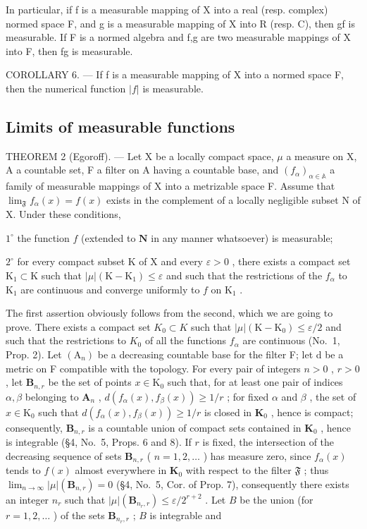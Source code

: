 In particular, if f is a measurable mapping of X into a real (resp. complex) normed space F, and g is a measurable mapping of X into R (resp. C), then gf is measurable. If F is a normed algebra and f,g are two measurable mappings of X into F, then fg is measurable.

COROLLARY 6. --- If f is a measurable mapping of X into a normed space F, then the numerical function \(|f|\) is measurable.

\subsection{Limits of measurable functions}

THEOREM 2 (Egoroff). --- Let X be a locally compact space, \(\mu\) a measure on X, A a countable set, F a filter on A having a countable base, and \((f_{\alpha})_{\alpha\in\mathbb{A}}\) a family of measurable mappings of X into a metrizable space F. Assume that \(\lim_{\mathfrak{F}} f_{\alpha}(x) = f(x)\) exists in the complement of a locally negligible subset N of X. Under these conditions,

\(1^{\circ}\) the function \(f\) (extended to \(\mathbf{N}\) in any manner whatsoever) is measurable;

\(2^{\circ}\) for every compact subset K of X and every \(\varepsilon > 0\) , there exists a compact set \(\mathrm{K}_{1} \subset \mathrm{K}\) such that \(|\mu| (\mathrm{K} - \mathrm{K}_{1}) \leqslant \varepsilon\) and such that the restrictions of the \(f_{\alpha}\) to \(\mathrm{K}_{1}\) are continuous and converge uniformly to \(f\) on \(\mathrm{K}_{1}\) .

The first assertion obviously follows from the second, which we are going to prove. There exists a compact set \(K_{0} \subset K\) such that \(|\mu|(\mathrm{K} - \mathrm{K}_{0}) \leqslant \varepsilon/2\) and such that the restrictions to \(K_{0}\) of all the functions \(f_{\alpha}\) are continuous (No.~1, Prop. 2). Let \((\mathrm{A}_{n})\) be a decreasing countable base for the filter F; let d be a metric on F compatible with the topology. For every pair of integers \(n > 0\) , \(r > 0\) , let \(\mathbf{B}_{n,r}\) be the set of points \(x \in \mathrm{K}_0\) such that, for at least one pair of indices \(\alpha, \beta\) belonging to \(\mathbf{A}_n\) , \(d(f_{\alpha}(x), f_{\beta}(x)) \geqslant 1 / r\) ; for fixed \(\alpha\) and \(\beta\) , the set of \(x \in \mathrm{K}_0\) such that \(d(f_{\alpha}(x), f_{\beta}(x)) \geqslant 1 / r\) is closed in \(\mathbf{K}_0\) , hence is compact; consequently, \(\mathbf{B}_{n,r}\) is a countable union of compact sets contained in \(\mathbf{K}_0\) , hence is integrable (§4, No.~5, Props. 6 and 8). If \(r\) is fixed, the intersection of the decreasing sequence of sets \(\mathbf{B}_{n,r}\) ( \(n = 1,2,\ldots\) ) has measure zero, since \(f_{\alpha}(x)\) tends to \(f(x)\) almost everywhere in \(\mathbf{K}_0\) with respect to the filter \(\mathfrak{F}\) ; thus \(\lim_{n \to \infty} |\mu|(\mathbf{B}_{n,r}) = 0\) (§4, No.~5, Cor. of Prop. 7), consequently there exists an integer \(n_r\) such that \(|\mu|(\mathbf{B}_{n_r,r}) \leqslant \varepsilon / 2^{r+2}\) . Let \(B\) be the union (for \(r = 1,2,\ldots\) ) of the sets \(\mathbf{B}_{n_r,r}\) ; \(B\) is integrable and

